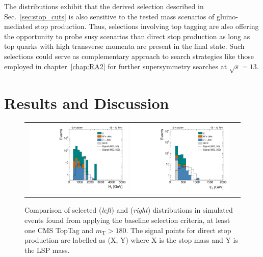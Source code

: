The distributions exhibit that the derived selection described in Sec.~\ref{sec:stop_cuts} is also sensitive to the tested mass scenarios of gluino-mediated stop production. Thus, selections involving top tagging are also offering the opportunity to probe susy scenarios than direct stop production as long as top quarks with high transverse momenta are present in the final state. Such selections could serve as complementary approach to search strategies like those employed in chapter~\ref{chap:RA2} for further supersymmetry searches at $\sqrt{s} = 13$\tev. 

\section{Results and Discussion}
\label{sec:stop_results}
\begin{figure}[!t]
  \centering
  \begin{tabular}{cc}
   
      \includegraphics[width=0.49\textwidth]{figures/Stop_TopTagTransverseMass_HThad_HighLSPMass.pdf}  
      \includegraphics[width=0.49\textwidth]{figures/Stop_TopTagTransverseMass_MET_HighLSPMass.pdf} 
    \end{tabular}
 
  \caption{Comparison of selected \HT (\textit{left}) and \met (\textit{right}) distributions in simulated events found from applying the baseline selection criteria, at least one CMS TopTag and $m_\mathrm{T} > 180$\gev. The signal points for direct stop production are labelled as (X, Y) where X is the stop mass and Y is the LSP mass.}
  \label{fig:stop_highLSP_ht_met}
\end{figure}
